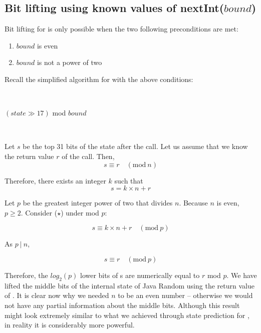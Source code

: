 \documentclass{article}
\begin{document}
\subsection{ Bit lifting using known values of nextInt($bound$) }

Bit lifting for  is only possible when the two following preconditions are met:
\begin{enumerate}
    \item $bound$ is even
    \item $bound$ is not a power of two
\end{enumerate}

\noindent Recall the simplified algorithm for  with the above conditions:

\
\begin{algorithmic}
    \State \Return $(state \gg 17)$ mod $bound$
\EndFunction
\end{algorithmic}
\ \

Let $s$ be the top 31 bits of the state after the  call. Let us assume that we know the return value $r$ of the  call. Then,
\begin{equation}
    s \equiv r \quad (\text{mod} \ n)
\end{equation}

\noindent Therefore, there exists an integer $k$ such that
\begin{equation}\tag{$\star$}
     s = k \times n + r
\end{equation}

\noindent Let $p$ be the greatest integer power of two that divides $n$. Because $n$ is even, $p \ge 2$. Consider ($\star$) under mod $p$:

\begin{equation}
     s \equiv k \times n + r \quad (\text{mod} \ p)
\end{equation}

\noindent As $p \ | \ n$,

\begin{equation}\label{lifting.core}\tag{$\star\star$}
     s \equiv r \quad (\text{mod} \ p)
\end{equation}

Therefore, the $log_2(p)$ lower bits of s are numerically equal to $r$ mod $p$. We have lifted the middle bits of the internal state of Java Random using the return value of . It is clear now why we needed $n$ to be an even number -- otherwise we would not have any partial information about the middle bits.
Although this result might look extremely similar to what we achieved through state prediction for \Call{nextInt}{$2^n$}, in reality it is considerably more powerful.
\end{document}
